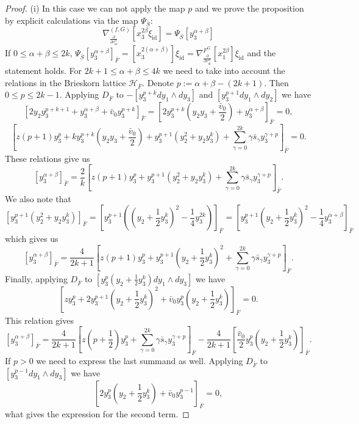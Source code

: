 \documentclass[reqno,12pt]{amsart}
\numberwithin{equation}{section}
\theoremstyle{plain}
\theoremstyle{definition}
\newcommand{\id}{\mathrm{id}}
\def\H{{\mathcal H}}
\numberwithin{equation}{section}
\begin{document}
\begin{proof}
 (i) In this case we can not apply the map $p$ and we prove the proposition by explicit calculations via the map $\Psi_{\bar{S}}$:
\[
 \nabla_{\frac{\partial}{\partial v^\alpha_{\id}}}^{(f,G)}[x_3^{2\beta}\xi_{\id}] = \Psi_{\bar{S}}[y_3^{\alpha+\beta}]
\]
If $0 \le \alpha+\beta \le 2k$, $\Psi_{\bar{S}} [y_3^{\alpha+\beta}]_{\bar{F}} = [x_3^{2(\alpha+\beta)}]\xi_{\id} = \nabla^{F^G}_{\frac{\partial}{\partial v^\alpha_\id}}[x_1^{2\beta}]\xi_{\id}$ and the statement holds. For $2k+1\le \alpha + \beta \le 4k$ we need to take into account the relations in the Brieskorn lattice $\H_{\bar F}$.
Denote $p := \alpha+\beta - (2k+1)$. Then $0 \le p \le 2k-1$. Applying $D_{\bar{F}}$ to $-[y_3^{p+k}dy_1\wedge dy_3]$ and $[y_3^{p+1}dy_1\wedge dy_2]$ we have
\[
[2y_2y_3^{p+k+1} + y_3^{\alpha+\beta} + \bar{v}_{0} y_3^{p+k}]_{\bar{F}} = [2y_3^{p+k}(y_2 y_3+ \frac{\bar{v}_0}{2}) + y_3^{\alpha+\beta}]_{\bar{F}}= 0,
\]
\[
[z(p+1)y_3^{p} + k y_3^{p+k}(y_2y_3 + \frac{\bar{v}_0}{2}) +  y_3^{p+1}(y_2^2 + y_2y_3^k) + \sum_{\gamma=0}^{2k}\gamma\bar{s}_\gamma y_3^{\gamma +p}]_{\bar{F}} = 0.
\]
These relations give us
\[
[y_3^{\alpha+\beta}]_{\bar{F}} = \frac{2}{k}[z(p+1)y_3^p + y_3^{p+1}(y_2^2 + y_2y_3^k) + \sum_{\gamma=0}^{2k}\gamma\bar{s}_\gamma y_3^{\gamma +p}]_{\bar{F}}.
\]
We also note that
\[
[y_3^{p+1}(y_2^2 + y_2y_3^k)]_{\bar{F}} = [y_3^{p+1}((y_2 + \frac{1}{2}y_3^k)^2 - \frac{1}{4}y_3^{2k})]_{\bar{F}} = [y_3^{p+1}(y_2 + \frac{1}{2}y_3^k)^2 - \frac{1}{4}y_3^{\alpha+\beta}]_{\bar{F}}
\]
which gives us
\[
[y_3^{\alpha+\beta}]_{\bar{F}} = \frac{4}{2k+1}[z(p+1)y_3^p + y_3^{p+1}(y_2 + \frac{1}{2}y_3^k)^2 + \sum_{\gamma=0}^{2k}\gamma\bar{s}_\gamma y_3^{\gamma +p}]_{\bar{F}}.
\]
Finally, applying $D_{\bar{F}}$ to $[y_3^{p}(y_2+\frac{1}{2}y_3^k) dy_1 \wedge dy_3]$ we have
\[
[z y_3^p + 2y_3^{p+1}(y_2+\frac{1}{2}y_3^k)^2 + \bar{v}_0 y_3^{p}(y_2+\frac{1}{2}y_3^k)]_{\bar{F}} = 0.
\]
This relation gives
\[
[y_3^{\alpha+\beta}]_{\bar{F}} = \frac{4}{2k+1}[z(p+\frac{1}{2})y_3^p + \sum_{\gamma=0}^{2k}\gamma\bar{s}_\gamma y_3^{\gamma +p}]_{\bar{F}} - \frac{4}{2k+1}[\frac{\bar{v}_0}{2}y_3^{p}(y_2+\frac{1}{2}y_3^k)]_{\bar{F}}.
\]
If $p > 0$ we need to express the last summand as well. Applying $D_{\bar F}$ to $[y_3^{p-1} dy_1 \wedge dy_3]$ we have
 \[
    [ 2y_3^p(y_2 + \frac{1}{2}y_3^k) + \bar v_0 y_3^{p-1}]_{\bar F} = 0,
 \]
 what gives the expression for the second term.


\end{proof}
\end{document}
